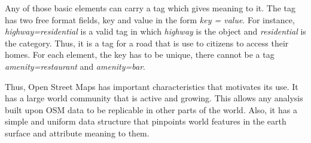 Any of those basic elements can carry a tag which gives meaning to it. The tag has two free format fields, key and value in the form \textit{key = value}. For instance, \textit{highway=residential} is a valid tag in which \textit{highway} is the object and  \textit{residential} is the category. Thus, it is a tag for a road that is use to citizens to access their homes. For each element, the key has to be unique, there cannot be a tag \textit{amenity=restaurant} and \textit{amenity=bar}.

Thus, Open Street Maps has important characteristics that motivates its use. It has a large world community that is active and growing. This allows any analysis built upon OSM data to be replicable in other parts of the world. Also, it has a simple and uniform data structure that pinpoints world features in the earth surface and attribute meaning to them.


